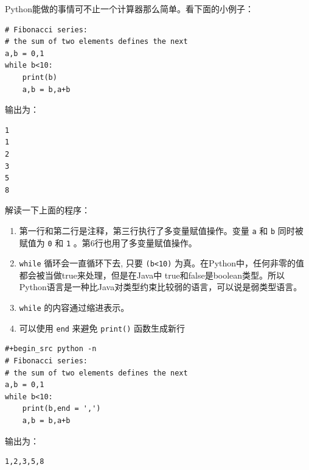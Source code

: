 \documentclass[10pt,a4paper,UTF8]{article}
\begin{document}
Python能做的事情可不止一个计算器那么简单。看下面的小例子：
\lstset{language=Python,label= ,caption= ,captionpos=b,firstnumber=1,numbers=left}
\begin{lstlisting}
# Fibonacci series:
# the sum of two elements defines the next
a,b = 0,1
while b<10:
    print(b)
    a,b = b,a+b
\end{lstlisting}
输出为：
\begin{verbatim}
1
1
2
3
5
8
\end{verbatim}

解读一下上面的程序：
\begin{enumerate}
\item 第一行和第二行是注释，第三行执行了多变量赋值操作。变量 \texttt{a} 和 \texttt{b} 同时被赋值为 \texttt{0} 和 \texttt{1} 。第6行也用了多变量赋值操作。
\item \texttt{while} 循环会一直循环下去, 只要 \texttt{(b<10)} 为真。在Python中，任何非零的值都会被当做true来处理，但是在Java中 true和false是boolean类型。所以Python语言是一种比Java对类型约束比较弱的语言，可以说是弱类型语言。
\item \texttt{while} 的内容通过缩进表示。
\item 可以使用 \texttt{end} 来避免 \texttt{print()} 函数生成新行
\end{enumerate}

\lstset{language=Python,label= ,caption= ,captionpos=b,numbers=none}
\begin{lstlisting}
#+begin_src python -n
# Fibonacci series:
# the sum of two elements defines the next
a,b = 0,1
while b<10:
    print(b,end = ',')
    a,b = b,a+b
\end{lstlisting}
输出为：
\begin{verbatim}
1,2,3,5,8
\end{verbatim}
\end{document}
